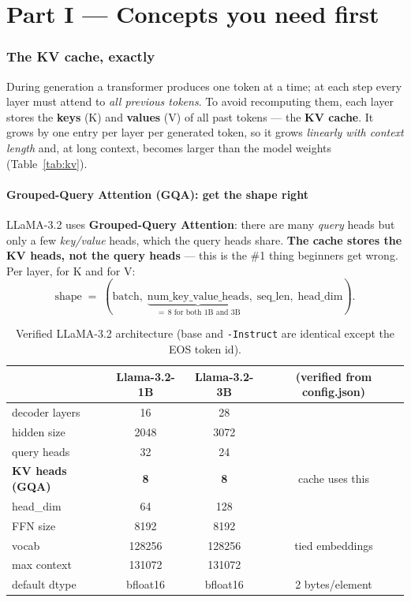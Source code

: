 \documentclass[11pt]{article}
\newcommand{\term}[1]{\textbf{\color{accent!85!black}#1}}
\begin{document}
\part*{Part I \;---\; Concepts you need first}

\section{The KV cache, exactly}

During generation a transformer produces one token at a time; at each step every layer must
attend to \emph{all previous tokens}. To avoid recomputing them, each layer stores the
\term{keys} (K) and \term{values} (V) of all past tokens --- the \term{KV cache}. It grows by
one entry per layer per generated token, so it grows \emph{linearly with context length} and,
at long context, becomes larger than the model weights (Table~\ref{tab:kv}).

\subsection{Grouped-Query Attention (GQA): get the shape right}
LLaMA-3.2 uses \term{Grouped-Query Attention}: there are many \emph{query} heads but only a few
\emph{key/value} heads, which the query heads share. \textbf{The cache stores the KV heads, not
the query heads} --- this is the \#1 thing beginners get wrong. Per layer, for K and for V:
\[
\text{shape} \;=\; (\text{batch},\; \underbrace{\text{num\_key\_value\_heads}}_{=\,8\text{ for both 1B and 3B}},\; \text{seq\_len},\; \text{head\_dim}).
\]

\begin{table}[h]
\centering
\small
\renewcommand{\arraystretch}{1.2}
\begin{tabular}{@{}lccc@{}}
\toprule
& \textbf{Llama-3.2-1B} & \textbf{Llama-3.2-3B} & (verified from config.json) \\
\midrule
decoder layers & 16 & 28 & \\
hidden size & 2048 & 3072 & \\
query heads & 32 & 24 & \\
\textbf{KV heads (GQA)} & \textbf{8} & \textbf{8} & cache uses this \\
head\_dim & 64 & 128 & \\
FFN size & 8192 & 8192 & \\
vocab & 128256 & 128256 & tied embeddings \\
max context & 131072 & 131072 & \\
default dtype & bfloat16 & bfloat16 & 2 bytes/element \\
\bottomrule
\end{tabular}
\caption{Verified LLaMA-3.2 architecture (base and \texttt{-Instruct} are identical except the EOS token id).}
\label{tab:arch}
\end{table}
\end{document}
